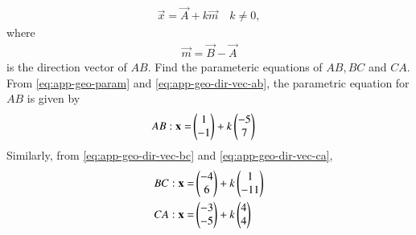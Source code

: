 \begin{enumerate}[label=\thesubsection.\arabic*.,ref=\thesubsection.\theenumi]
		\begin{align}
			\label{eq:app-geo-param}
			\vec{x}=\vec{A}+k\vec{m} \quad k \ne 0,
		\end{align}
		where
		\begin{align}
\vec{m}=\vec{B}-\vec{A}
		\end{align}
is the direction vector of $AB$.
Find the parameteric equations of $AB, BC$ and $CA$.
\\
\solution
From 
			\eqref{eq:app-geo-param} and
		\eqref{eq:app-geo-dir-vec-ab},
the parametric equation for $AB$ is given by
\begin{align}
AB: \mathbf{x} = &\begin{pmatrix}1\\-1\end{pmatrix} + k \begin{pmatrix}-5\\7\end{pmatrix}
\end{align}
Similarly, from 
		\eqref{eq:app-geo-dir-vec-bc} and
		\eqref{eq:app-geo-dir-vec-ca},
\begin{align}
BC: \mathbf{x} = &\begin{pmatrix}-4\\6\end{pmatrix} + k \begin{pmatrix}1\\-11\end{pmatrix}\\
CA: \mathbf{x} = &\begin{pmatrix}-3\\-5\end{pmatrix} + k \begin{pmatrix}4\\4\end{pmatrix}
\end{align}


\end{enumerate}
